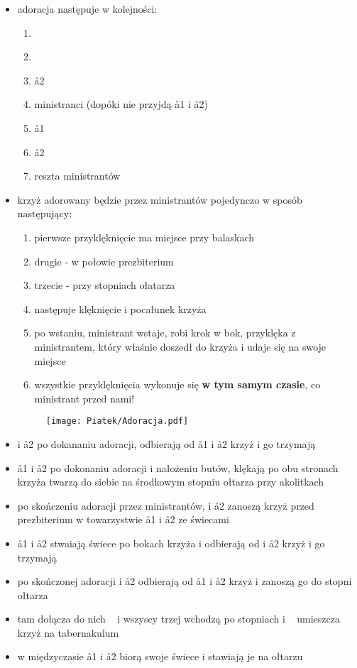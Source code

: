 \begin{itemize}
        \item adoracja następuje w kolejności:
     
        \begin{enumerate}\centering
            \item[] \ii~
            \item[] 
            \item[] \aa2
            \item[] ministranci (dopóki nie przyjdą \aa1 i \aa2)
            \item[] \aa1
            \item[] \aa2 
            \item[] reszta ministrantów
        \end{enumerate}
     
        \item krzyż adorowany będzie przez ministrantów pojedynczo w sposób następujący:
     
        \begin{enumerate}[leftmargin=1cm]
            \item pierwsze przyklęknięcie ma miejsce przy balaskach
            \item drugie - w połowie prezbiterium
            \item trzecie - przy stopniach ołatarza
            \item następuje klęknięcie i pocałunek krzyża
            \item po wstaniu, ministrant wstaje, robi krok w bok, przyklęka z ministrantem, który właśnie doszedł do krzyża  i udaje się na swoje miejsce
            \item wszystkie przyklęknięcia wykonuje się \textbf{w tym samym czasie}, co ministrant przed nami!
        \end{enumerate}
      
        \begin{figure}[h]
            \centering
            \texttt{[image: Piatek/Adoracja.pdf]}
        \end{figure}
     
        \item {} i \aa2 po dokananiu adoracji, odbierają od \aa1 i \aa2 krzyż i go trzymają
        \item \aa1 i \aa2 po dokonaniu adoracji i nałożeniu butów, klękają po obu stronach krzyża twarzą do siebie na środkowym stopniu ołtarza przy akolitkach  
        \item po skończeniu adoracji przez ministrantów,  i \aa2 zanoszą krzyż przed prezbiterium w towarzystwie \aa1 i \aa2 ze świecami
        \item \aa1 i \aa2 stwaiają świece po bokach krzyża i odbierają od  i \aa2 krzyż i go trzymają
        \item po skończonej adoracji  i \aa2 odbierają od \aa1 i \aa2 krzyż i zanoszą go do stopni ołtarza
        \item tam dołącza do nich \ii~ i wszyscy trzej wchodzą po stopniach i \ii~ umieszcza krzyż na tabernakulum
        \item w międzyczasie \aa1 i \aa2 biorą swoje świece i stawiają je na ołtarzu
    \end{itemize}
    